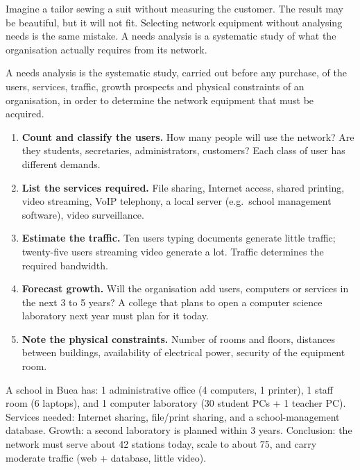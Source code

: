 \documentclass[11pt]{article}
\newcommand{\cle}[1]{{\popxbold\color{popdark}#1}}
\begin{document}
Imagine a tailor sewing a suit without measuring the customer. The result may be beautiful, but it will not fit. Selecting network equipment without analysing needs is the same mistake. A \cle{needs analysis} is a systematic study of what the organisation actually requires from its network.

\begin{definition}
A \cle{needs analysis} is the systematic study, carried out before any purchase, of the users, services, traffic, growth prospects and physical constraints of an organisation, in order to determine the network equipment that must be acquired.
\end{definition}

\begin{methode}
\begin{enumerate}
\item \textbf{Count and classify the users.} How many people will use the network? Are they students, secretaries, administrators, customers? Each class of user has different demands.
\item \textbf{List the services required.} File sharing, Internet access, shared printing, video streaming, VoIP telephony, a local server (e.g.\ school management software), video surveillance.
\item \textbf{Estimate the traffic.} Ten users typing documents generate little traffic; twenty-five users streaming video generate a lot. Traffic determines the required \cle{bandwidth}.
\item \textbf{Forecast growth.} Will the organisation add users, computers or services in the next 3 to 5 years? A college that plans to open a computer science laboratory next year must plan for it today.
\item \textbf{Note the physical constraints.} Number of rooms and floors, distances between buildings, availability of electrical power, security of the equipment room.
\end{enumerate}
\end{methode}

\begin{exemplebox}
A school in Buea has: 1 administrative office (4 computers, 1 printer), 1 staff room (6 laptops), and 1 computer laboratory (30 student PCs + 1 teacher PC). Services needed: Internet sharing, file/print sharing, and a school-management database. Growth: a second laboratory is planned within 3 years. Conclusion: the network must serve about 42 stations today, scale to about 75, and carry moderate traffic (web + database, little video).
\end{exemplebox}
\end{document}

